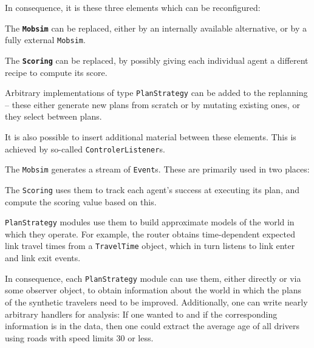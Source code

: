 In consequence, it is these three elements which can be reconfigured:
\begin{compactitem}

\item The \textbf{\tt Mobsim} can be replaced, either by an internally available alternative, or by a fully external \verb$Mobsim$.


\item The \textbf{\tt Scoring} can be replaced, by possibly giving each individual agent a different recipe to compute its score.

\item Arbitrary implementations of type \verb$PlanStrategy$ can be added to the replanning -- these either generate new plans from scratch or by mutating existing ones, or they select between plans.

\end{compactitem}
It is also possible to insert additional material between these elements.  This is achieved by so-called \verb$ControlerListener$s.

The \verb$Mobsim$ generates a stream of \verb$Event$s.  These are primarily used in two places:
\begin{compactitem}

\item The \verb$Scoring$ uses them to track each agent's success at executing its plan, and compute the scoring value based on this.

\item \verb$PlanStrategy$ modules use them to build approximate models of the world in which they operate.  For example, the router obtains time-dependent expected link travel times from a \verb$TravelTime$ object, which in turn listens to link enter and link exit events.
  
\end{compactitem}
In consequence, each \verb$PlanStrategy$ module can use them, either directly or via some observer object, to obtain information about the world in which the plans of the synthetic travelers need to be improved. Additionally, one can write nearly arbitrary handlers for analysis: If one wanted to and if the corresponding information is in the data, then one could extract the average age of all drivers using roads with speed limits 30 or less.


